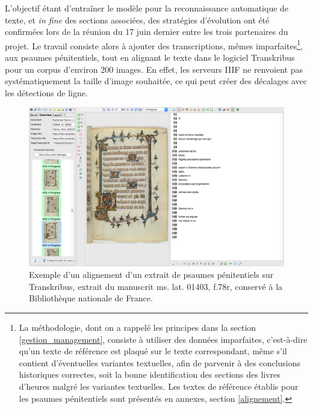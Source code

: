 \documentclass[a4paper,12pt,twoside]{book}
\begin{document}
L'objectif étant d'entraîner le modèle pour la reconnaissance automatique de texte, et \textit{in fine} des sections associées, des stratégies d'évolution ont été confirmées lors de la réunion du 17 juin dernier entre les trois partenaires du projet. Le travail consiste alors à ajouter des transcriptions, mêmes imparfaites\footnote{La méthodologie, dont on a rappelé les principes dans la section \ref{gestion_management}, consiste à utiliser des données imparfaites, c'est-à-dire qu'un texte de référence est plaqué sur le texte correspondant, même s'il contient d'éventuelles variantes textuelles, afin de parvenir à des conclusions historiques correctes, soit la bonne identification des sections des livres d'heures malgré les variantes textuelles. Les textes de référence établis pour les psaumes pénitentiels sont présentés en annexes, section \ref{alignement}.}, aux psaumes pénitentiels, tout en alignant le texte dans le logiciel Transkribus pour un corpus d'environ 200 images. En effet, les serveurs IIIF ne renvoient pas systématiquement la taille d'image souhaitée, ce qui peut créer des décalages avec les détections de ligne. \\

	\begin{figure}[!h]
    \centering
    \includegraphics[width=13cm]{img/ML/psaumes_transkribus.png}

    \caption{Exemple d'un alignement d'un extrait de psaumes pénitentiels sur Transkribus, extrait du manuscrit ms. lat. 01403, f.78r, conservé à la Bibliothèque nationale de France.}
    \end{figure}
\end{document}
